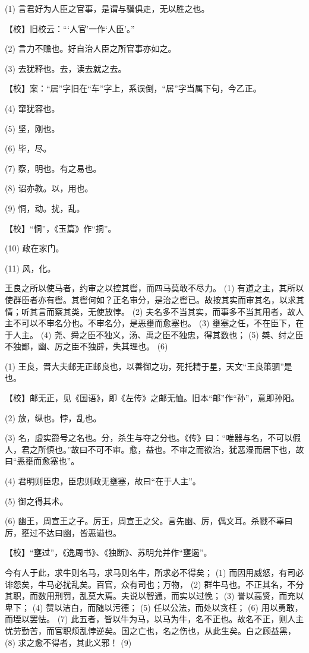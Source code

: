 \documentclass[12pt,UTF8]{ctexbook}
\begin{document}
(1) 言君好为人臣之官事，是谓与骥俱走，无以胜之也。

【校】旧校云：“‘人官’一作‘人臣’。”

(2) 言力不赡也。好自治人臣之所官事亦如之。

(3) 去犹释也。去，读去就之去。

【校】案：“居”字旧在“车”字上，系误倒，“居”字当属下句，今乙正。

(4) 窜犹容也。

(5) 坚，刚也。

(6) 毕，尽。

(7) 察，明也。有之易也。

(8) 诏亦教。以，用也。

(9) 恫，动。扰，乱。

【校】“恫”，《玉篇》作“挏”。

(10) 政在家门。

(11) 风，化。

王良之所以使马者，约审之以控其辔，而四马莫敢不尽力。 (1) 有道之主，其所以使群臣者亦有辔。其辔何如？正名审分，是治之辔已。故按其实而审其名，以求其情；听其言而察其类，无使放悖。 (2) 夫名多不当其实，而事多不当其用者，故人主不可以不审名分也。不审名分，是恶壅而愈塞也。 (3) 壅塞之任，不在臣下，在于人主。 (4) 尧、舜之臣不独义，汤、禹之臣不独忠，得其数也； (5) 桀、纣之臣不独鄙，幽、厉之臣不独辟，失其理也。 (6)

(1) 王良，晋大夫邮无正邮良也，以善御之功，死托精于星，天文“王良策驷”是也。

【校】邮无正，见《国语》，即《左传》之邮无恤。旧本“邮”作“孙”，意即孙阳。

(2) 放，纵也。悖，乱也。

(3) 名，虚实爵号之名也。分，杀生与夺之分也。《传》曰：“唯器与名，不可以假人，君之所慎也。”故曰不可不审。愈，益也。不审之而欲治，犹恶湿而居下也，故曰“恶壅而愈塞也”。

(4) 君明则臣忠，臣忠则政无壅塞，故曰“在于人主”。

(5) 御之得其术。

(6) 幽王，周宣王之子。厉王，周宣王之父。言先幽、厉，偶文耳。杀戮不辜曰厉，壅过不达曰幽，皆恶谥也。

【校】“壅过”，《逸周书》、《独断》、苏明允并作“壅遏”。

今有人于此，求牛则名马，求马则名牛，所求必不得矣； (1) 而因用威怒，有司必诽怨矣，牛马必扰乱矣。百官，众有司也；万物， (2) 群牛马也。不正其名，不分其职，而数用刑罚，乱莫大焉。夫说以智通，而实以过悗； (3) 誉以高贤，而充以卑下； (4) 赞以洁白，而随以污德； (5) 任以公法，而处以贪枉； (6) 用以勇敢，而堙以罢怯。 (7) 此五者，皆以牛为马，以马为牛，名不正也。故名不正，则人主忧劳勤苦，而官职烦乱悖逆矣。国之亡也，名之伤也，从此生矣。白之顾益黑， (8) 求之愈不得者，其此义邪！ (9)
\end{document}
